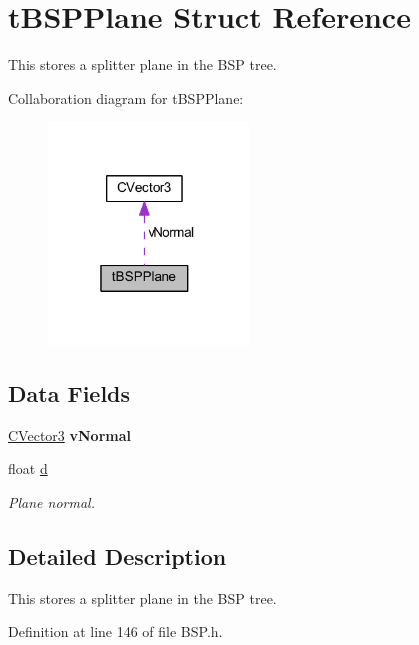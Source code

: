 \hypertarget{structt_b_s_p_plane}{}\section{t\+B\+S\+P\+Plane Struct Reference}
\label{structt_b_s_p_plane}


This stores a splitter plane in the B\+SP tree.  




Collaboration diagram for t\+B\+S\+P\+Plane\+:
\nopagebreak
\begin{figure}[H]
\begin{center}
\leavevmode
\includegraphics[width=151pt]{structt_b_s_p_plane__coll__graph}
\end{center}
\end{figure}
\subsection*{Data Fields}
\begin{DoxyCompactItemize}
\item 
\hyperlink{struct_c_vector3}{C\+Vector3} {\bfseries v\+Normal}\hypertarget{structt_b_s_p_plane_aee2797a040b27a7a2c4a273e0bc7b443}{}\label{structt_b_s_p_plane_aee2797a040b27a7a2c4a273e0bc7b443}

\item 
float \hyperlink{structt_b_s_p_plane_a5b14756986ce09049188ae8219fcb0a6}{d}\hypertarget{structt_b_s_p_plane_a5b14756986ce09049188ae8219fcb0a6}{}\label{structt_b_s_p_plane_a5b14756986ce09049188ae8219fcb0a6}

\begin{DoxyCompactList}\small\item\em Plane normal. \end{DoxyCompactList}\end{DoxyCompactItemize}


\subsection{Detailed Description}
This stores a splitter plane in the B\+SP tree. 

Definition at line 146 of file B\+S\+P.\+h.


